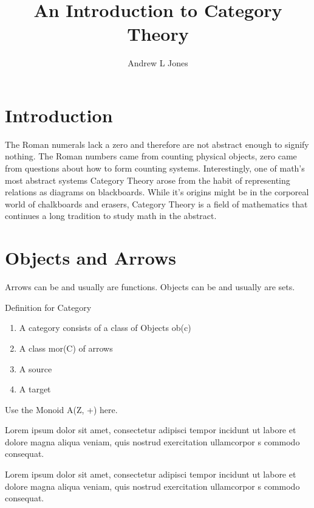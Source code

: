 \documentclass{article}
\title{An Introduction to Category Theory}
\author{Andrew L Jones}\date{}
\begin{document}
\maketitle



\section*{Introduction}
The Roman numerals lack a zero and therefore are not abstract enough to signify nothing. The Roman numbers came from counting physical objects, zero came from questions about how to form counting systems. Interestingly, one of math's most abstract systems Category Theory arose from the habit of representing relations as diagrams on blackboards. While it's origins might be in the corporeal world of chalkboards and erasers, Category Theory is a field of mathematics that continues a long tradition to study math in the abstract.


\section{Objects and Arrows}
Arrows can be and usually are functions. Objects can be and usually are sets.
\begin{definition}
Definition for Category
\end{definition}
\begin{enumerate}
  \item A category consists of a class of Objects ob(c)
  \item A class mor(C) of arrows
  \item A source
  \item A target
\end{enumerate}
\begin{example}
Use the Monoid A(Z, +) here.
\end{example}

Lorem ipsum dolor sit amet, consectetur adipisci tempor incidunt ut labore et dolore magna aliqua veniam, quis nostrud exercitation ullamcorpor s commodo consequat. 

\begin{definition}\label{def:lorem}
	Lorem ipsum dolor sit amet, consectetur adipisci tempor incidunt ut labore et dolore magna aliqua veniam, quis nostrud exercitation ullamcorpor s commodo consequat.
\end{definition}
\end{document}
